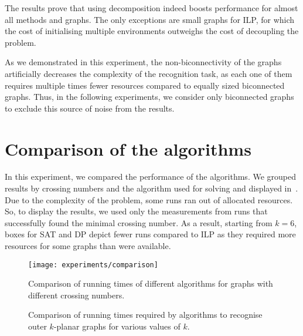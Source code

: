 The results prove that using decomposition indeed boosts performance for almost all methods and graphs. The only exceptions are small graphs for \textsf{ILP}, for which the cost of initialising multiple environments outweighs the cost of decoupling the problem.

As we demonstrated in this experiment, the non-biconnectivity of the graphs artificially decreases the complexity of the recognition task, as each one of them requires multiple times fewer resources compared to equally sized biconnected graphs. Thus, in the following experiments, we consider only biconnected graphs to exclude this source of noise from the results.

\section{Comparison of the algorithms}

In this experiment, we compared the performance of the algorithms. We grouped results by crossing numbers and the algorithm used for solving and displayed in~. Due to the complexity of the problem, some runs ran out of allocated resources. So, to display the results, we used only the measurements from runs that successfully found the minimal crossing number. As a result, starting from \(k = 6\), boxes for \textsf{SAT} and \textsf{DP} depict fewer runs compared to \textsf{ILP} as they required more resources for some graphs than were available.

\begin{figure}
    \centering
    \texttt{[image: experiments/comparison]}
    \caption{Comparison of running times of different algorithms for graphs with different crossing numbers.}
    \label{fig:methods}
\end{figure}

\begin{figure}
    \centering
     \hfill
     \hfill
     \hfill
     \hfill
    \caption{Comparison of running times required by algorithms to recognise outer \(k\)-planar graphs for various values of \(k\).}
    \label{fig:methods-vertices}
\end{figure}

